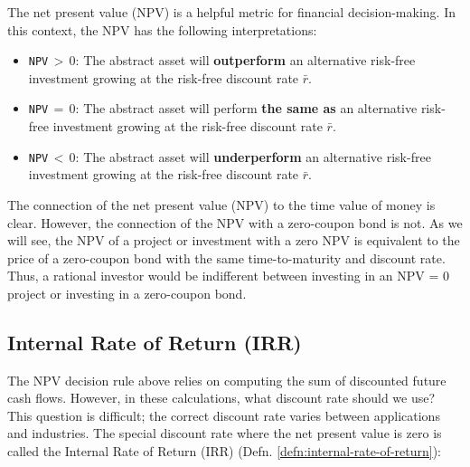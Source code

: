 \documentclass[11pt]{article}
\theoremstyle{definition}
\begin{document}
The net present value (NPV) is a helpful metric for financial decision-making.
In this context, the NPV has the following interpretations:
\begin{itemize}[leftmargin=*]
	\item{\texttt{NPV}$\,>\,0$: The abstract asset will \textbf{outperform} an alternative risk-free investment growing at the risk-free discount rate $\bar{r}$.}
	\item{\texttt{NPV}$\,=\,0$: The abstract asset will perform \textbf{the same as} an alternative risk-free investment growing at the risk-free discount rate $\bar{r}$.}
	\item{\texttt{NPV}$\,<\,0$: The abstract asset will \textbf{underperform} an alternative risk-free investment growing at the risk-free discount rate $\bar{r}$.}
\end{itemize}

The connection of the net present value (NPV) to the time value of money is clear.
However, the connection of the NPV with a zero-coupon bond is not. 
As we will see, the NPV of a project or investment with a zero NPV is equivalent to the price of a zero-coupon bond with the same time-to-maturity 
and discount rate. Thus, a rational investor would be indifferent between investing in an NPV = 0 project or investing in a zero-coupon bond.

\subsection{Internal Rate of Return (IRR)}
The NPV decision rule above relies on computing the sum of discounted future cash flows. 
However, in these calculations, what discount rate should we use? This question is difficult; the correct discount rate varies between applications and industries.  
The special discount rate where the net present value is zero is called the Internal Rate of Return (IRR) (Defn. \ref{defn:internal-rate-of-return}):
\end{document}
